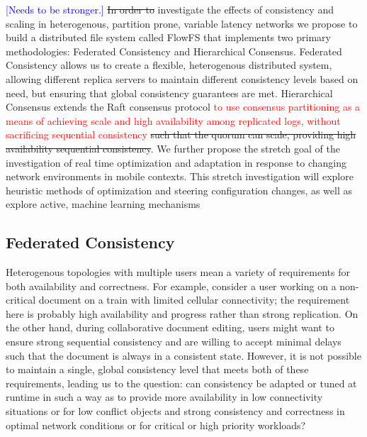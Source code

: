 \documentclass{article}
\newcommand{\pjk}[1]{{\bf
    [\marginpar[\hbox{{\textcolor{blue}{pjk}}\raisebox{0ex}{\Huge $\rightarrow$}}]%
{\hbox{\raisebox{0ex}{\Huge $\leftarrow$}{\textcolor{blue}{pjk}}}}\textcolor{blue}{#1}]}}
\renewcommand{\pjk}[1]{\textcolor{blue}{[#1]}}
\newcommand{\pete}[1]{\textcolor{red}{#1}}
\begin{document}
\pjk{Needs to be stronger.} \sout{In order to} investigate the effects of consistency and scaling in heterogenous, partition prone, variable latency networks we propose to build a distributed file system called FlowFS that implements two primary methodologies: Federated Consistency and Hierarchical Consensus. Federated Consistency allows us to create a flexible, heterogenous distributed system, allowing different replica servers to maintain different consistency levels based on need, but ensuring that global consistency guarantees are met. Hierarchical Consensus extends the Raft consensus protocol \pete{to use consensus partitioning as a means of achieving scale and high availability among replicated logs, without sacrificing sequential consistency} \sout{such that the quorum can scale, providing high availability sequential consistency}. We further propose the stretch goal of the investigation of real time optimization and adaptation in response to changing network environments in mobile contexts. This stretch investigation will explore heuristic methods of optimization and steering configuration changes, as well as explore active, machine learning mechanisms

\subsection{Federated Consistency}

Heterogenous topologies with multiple users mean a variety of requirements for both availability and correctness. For example, consider a user working on a non-critical document on a train with limited cellular connectivity; the requirement here is probably high availability and progress rather than strong replication. On the other hand, during collaborative document editing, users might want to ensure strong sequential consistency and are willing to accept minimal delays such that the document is always in a consistent state. However, it is not possible to maintain a single, global consistency level that meets both of these requirements, leading us to the question: can consistency be adapted or tuned at runtime in such a way as to provide more availability in low connectivity situations or for low conflict objects and strong consistency and correctness in optimal network conditions or for critical or high priority workloads?
\end{document}
